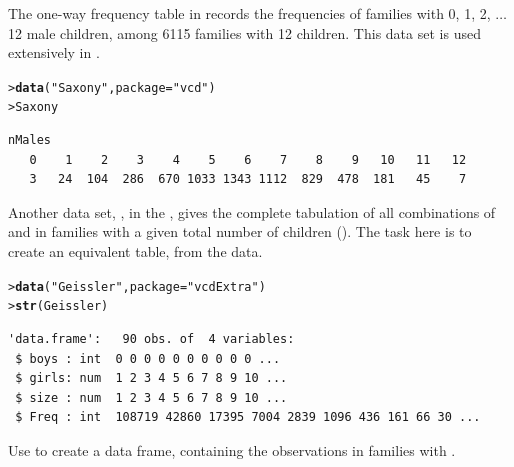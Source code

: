 \documentclass[11pt]{report}\usepackage[]{graphicx}\usepackage[]{color}
\makeatletter
\newcommand{\hlstr}[1]{\textcolor[rgb]{0.192,0.494,0.8}{#1}}%
\newcommand{\hlstd}[1]{\textcolor[rgb]{0.345,0.345,0.345}{#1}}%
\newcommand{\hlkwc}[1]{\textcolor[rgb]{0.333,0.667,0.333}{#1}}%
\newcommand{\hlkwd}[1]{\textcolor[rgb]{0.737,0.353,0.396}{\textbf{#1}}}%
\newenvironment{kframe}{%
 \def\at@end@of@kframe{}%
 \ifinner\ifhmode%
  \def\at@end@of@kframe{\end{minipage}}%
  \begin{minipage}{\columnwidth}%
 \fi\fi%
 \def\FrameCommand##1{\hskip\@totalleftmargin \hskip-\fboxsep
 \colorbox{shadecolor}{##1}\hskip-\fboxsep
     \hskip-\linewidth \hskip-\@totalleftmargin \hskip\columnwidth}%
 \MakeFramed {\advance\hsize-\width
   \@totalleftmargin\z@ \linewidth\hsize
   \@setminipage}}%
 {\par\unskip\endMakeFramed%
 \at@end@of@kframe}
\newenvironment{knitrout}{}{} %
\renewenvironment{knitrout}{\small\renewcommand{\baselinestretch}{.85}}{} %
\makeatother
\begin{document}
\begin{Exercises}
\exercise The one-way frequency table  in  records the frequencies
of families with 0, 1, 2, $\dots$ 12 male children, among 6115 families with 12
children.  This data set is used extensively in .
\begin{knitrout}
\color{fgcolor}\begin{kframe}
\begin{alltt}
\hlstd{> }\hlkwd{data}\hlstd{(}\hlstr{"Saxony"}\hlstd{,} \hlkwc{package} \hlstd{=} \hlstr{"vcd"}\hlstd{)}
\hlstd{> }\hlstd{Saxony}
\end{alltt}
\begin{verbatim}
nMales
   0    1    2    3    4    5    6    7    8    9   10   11   12 
   3   24  104  286  670 1033 1343 1112  829  478  181   45    7 
\end{verbatim}
\end{kframe}
\end{knitrout}
Another data set, , in the , gives the complete
tabulation of all combinations of  and  in families with
a given total number of children ().  The task here is to create an
equivalent table,  from the  data.
\begin{knitrout}
\color{fgcolor}\begin{kframe}
\begin{alltt}
\hlstd{> }\hlkwd{data}\hlstd{(}\hlstr{"Geissler"}\hlstd{,} \hlkwc{package} \hlstd{=} \hlstr{"vcdExtra"}\hlstd{)}
\hlstd{> }\hlkwd{str}\hlstd{(Geissler)}
\end{alltt}
\begin{verbatim}
'data.frame':	90 obs. of  4 variables:
 $ boys : int  0 0 0 0 0 0 0 0 0 0 ...
 $ girls: num  1 2 3 4 5 6 7 8 9 10 ...
 $ size : num  1 2 3 4 5 6 7 8 9 10 ...
 $ Freq : int  108719 42860 17395 7004 2839 1096 436 161 66 30 ...
\end{verbatim}
\end{kframe}
\end{knitrout}
  \begin{enumerate*}
    \item Use  to create a data frame,  containing
    the  observations in families with .
    \begin{ans}
\begin{knitrout}
\color{fgcolor}\begin{kframe}

\end{kframe}
\end{knitrout}
\end{ans}
\end{enumerate*}
\end{Exercises}
\end{document}
